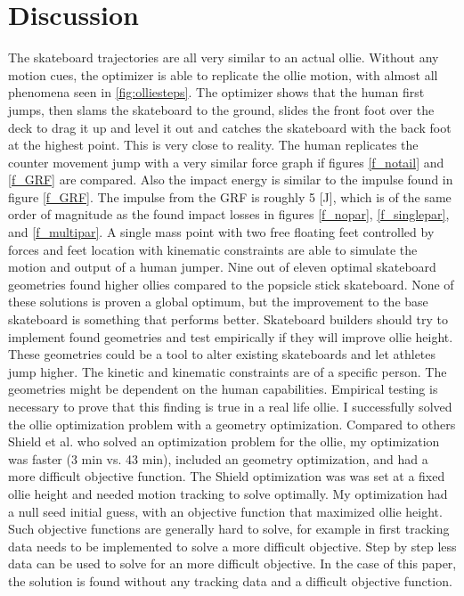 \documentclass[default,iicol]{sn-jnl}
\begin{document}
{\section{Discussion}
\noindent The skateboard trajectories are all very similar to an actual ollie. Without any motion cues, the optimizer is able to replicate the ollie motion, with almost all phenomena seen in \ref{fig:olliesteps}. The optimizer shows that the human first jumps, then slams the skateboard to the ground, slides the front foot over the deck to drag it up and level it out and catches the skateboard with the back foot at the highest point. This is very close to reality. The human replicates the counter movement jump with a very similar force graph if figures \ref{f_notail} and \ref{f_GRF} are compared. Also the impact energy is similar to the impulse found in figure \ref{f_GRF}. The impulse from the GRF is roughly 5 [J], which is of the same order of magnitude as the found impact losses in figures \ref{f_nopar}, \ref{f_singlepar}, and \ref{f_multipar}.
A single mass point with two free floating feet controlled by forces and feet location with kinematic constraints are able to simulate the motion and output of a human jumper. 
Nine out of eleven optimal skateboard geometries found higher ollies compared to the popsicle stick skateboard. None of these solutions is proven a global optimum, but the improvement to the base skateboard is something that performs better. Skateboard builders should try to implement found geometries and test empirically if they will improve ollie height. These geometries could be a tool to alter existing skateboards and let athletes jump higher. The kinetic and kinematic constraints are of a specific person. The geometries might be dependent on the human capabilities. Empirical testing is necessary to prove that this finding is true in a real life ollie. I successfully solved the ollie optimization problem with a geometry optimization. Compared to others Shield et al. \cite{shield_contact-implicit_2022} who solved an optimization problem for the ollie, my optimization was faster (3 min vs. 43 min), included an geometry optimization, and had a more difficult objective function. The Shield optimization was was set at a fixed ollie height and needed motion tracking to solve optimally. My optimization had a null seed initial guess, with an objective function that maximized ollie height. Such objective functions are generally hard to solve, for example in \cite{nitschke_efficient_2020} first tracking data needs to be implemented to solve a more difficult objective. Step by step less data can be used to solve for an more difficult objective. In the case of this paper, the solution is found without any tracking data and a difficult objective function. 
}
\end{document}
